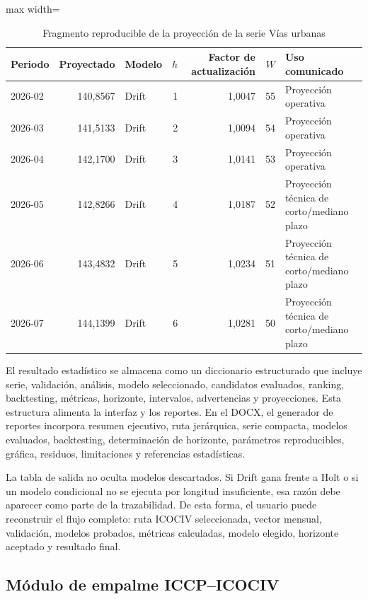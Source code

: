 \documentclass[12pt,letterpaper]{article}
\newcommand{\ICOCIV}{ICOCIV}
\begin{document}
\begin{table}[H]
\centering
\caption{Fragmento reproducible de la proyección de la serie Vías urbanas}
\label{tab:reproducibilidad_real_icociv}
\vspace{\baselineskip}
\scriptsize
\begin{adjustbox}{max width=\textwidth}
\begin{tabular}{lrlrrrl}
\toprule
\textbf{Periodo} & \textbf{Proyectado} & \textbf{Modelo} & \textbf{\(h\)} & \textbf{Factor de actualización} & \textbf{\(W\)} & \textbf{Uso comunicado} \\
\midrule
2026-02 & 140,8567 & Drift & 1 & 1,0047 & 55 & Proyección operativa \\
2026-03 & 141,5133 & Drift & 2 & 1,0094 & 54 & Proyección operativa \\
2026-04 & 142,1700 & Drift & 3 & 1,0141 & 53 & Proyección operativa \\
2026-05 & 142,8266 & Drift & 4 & 1,0187 & 52 & Proyección técnica de corto/mediano plazo \\
2026-06 & 143,4832 & Drift & 5 & 1,0234 & 51 & Proyección técnica de corto/mediano plazo \\
2026-07 & 144,1399 & Drift & 6 & 1,0281 & 50 & Proyección técnica de corto/mediano plazo \\
\bottomrule
\end{tabular}
\end{adjustbox}
\end{table}

El resultado estadístico se almacena como un diccionario estructurado que incluye serie, validación, análisis, modelo seleccionado, candidatos evaluados, ranking, backtesting, métricas, horizonte, intervalos, advertencias y proyecciones. Esta estructura alimenta la interfaz y los reportes. En el DOCX, el generador de reportes incorpora resumen ejecutivo, ruta jerárquica, serie compacta, modelos evaluados, backtesting, determinación de horizonte, parámetros reproducibles, gráfica, residuos, limitaciones y referencias estadísticas.

La tabla de salida no oculta modelos descartados. Si Drift gana frente a Holt o si un modelo condicional no se ejecuta por longitud insuficiente, esa razón debe aparecer como parte de la trazabilidad. De esta forma, el usuario puede reconstruir el flujo completo: ruta \ICOCIV{} seleccionada, vector mensual, validación, modelos probados, métricas calculadas, modelo elegido, horizonte aceptado y resultado final.

\subsection{Módulo de empalme ICCP--ICOCIV}
\end{document}
